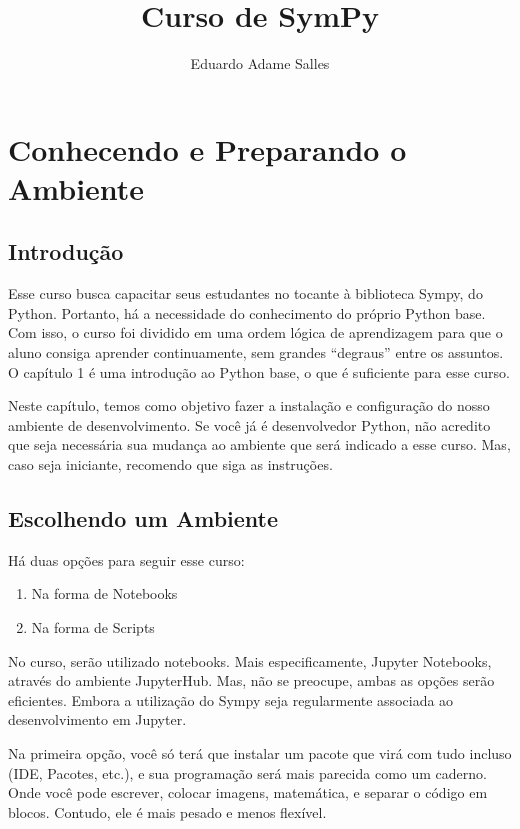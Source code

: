 \documentclass[a4paper, 11pt, brazilian]{article}
\title{Curso de SymPy}
\author{Eduardo Adame Salles}
\providecommand{\tightlist}{%
      \setlength{\itemsep}{0pt}\setlength{\parskip}{0pt}}
\begin{document}
    
    
    \newpage
    \tableofcontents
    \newpage
    
    \hypertarget{conhecendo-e-preparando-o-ambiente}{%
\section{Conhecendo e Preparando o
Ambiente}\label{conhecendo-e-preparando-o-ambiente}}

\hypertarget{introduuxe7uxe3o}{%
\subsection{Introdução}\label{introduuxe7uxe3o}}

Esse curso busca capacitar seus estudantes no tocante à biblioteca
Sympy, do Python. Portanto, há a necessidade do conhecimento do próprio
Python base. Com isso, o curso foi dividido em uma ordem lógica de
aprendizagem para que o aluno consiga aprender continuamente, sem
grandes ``degraus'' entre os assuntos. O capítulo 1 é uma introdução ao
Python base, o que é suficiente para esse curso.

Neste capítulo, temos como objetivo fazer a instalação e configuração do
nosso ambiente de desenvolvimento. Se você já é desenvolvedor Python,
não acredito que seja necessária sua mudança ao ambiente que será
indicado a esse curso. Mas, caso seja iniciante, recomendo que siga as
instruções.

\hypertarget{escolhendo-um-ambiente}{%
\subsection{Escolhendo um Ambiente}\label{escolhendo-um-ambiente}}

Há duas opções para seguir esse curso:

\begin{enumerate}
\def\labelenumi{\arabic{enumi}.}
\tightlist
\item
  Na forma de Notebooks
\item
  Na forma de Scripts
\end{enumerate}

No curso, serão utilizado notebooks. Mais especificamente, Jupyter
Notebooks, através do ambiente JupyterHub. Mas, não se preocupe, ambas
as opções serão eficientes. Embora a utilização do Sympy seja
regularmente associada ao desenvolvimento em Jupyter.

Na primeira opção, você só terá que instalar um pacote que virá com tudo
incluso (IDE, Pacotes, etc.), e sua programação será mais parecida como
um caderno. Onde você pode escrever, colocar imagens, matemática, e
separar o código em blocos. Contudo, ele é mais pesado e menos flexível.
\end{document}
